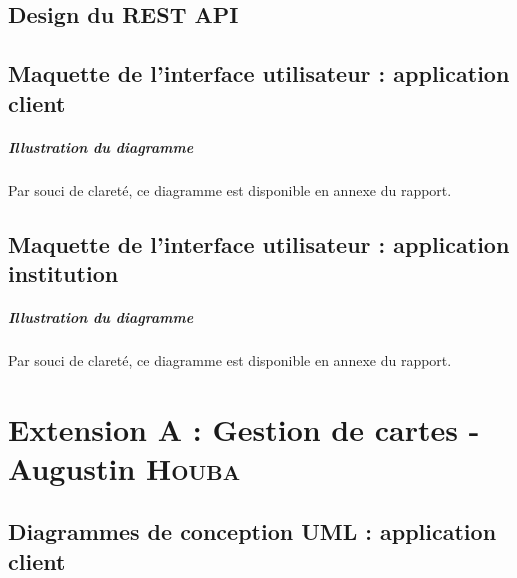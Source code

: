 \documentclass[]{report}
\begin{document}
\newpage


\section{Design du REST API}


\newpage


\section{Maquette de l'interface utilisateur : application client}



\vspace*{\fill}

\paragraph{Illustration du diagramme} Par souci de clareté, ce diagramme est disponible en annexe du rapport.

\newpage



\section{Maquette de l'interface utilisateur : application institution}



\vspace*{\fill}

\paragraph{Illustration du diagramme} Par souci de clareté, ce diagramme est disponible en annexe du rapport.

\newpage





\chapter{Extension A : Gestion de cartes - Augustin \textsc{Houba}}


\newpage


\section{Diagrammes de conception UML : application client}
\end{document}
